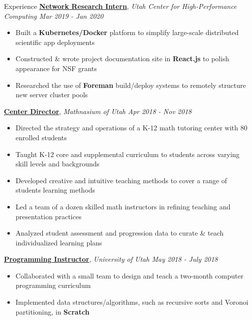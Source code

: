 \documentclass{resume/resume}
\begin{document}
\begin{rSection}{Experience}
    \href{https://slateci.io/}{\bf Network Research Intern}, {\em Utah Center for High-Performance Computing \hfill Mar 2019 - Jan 2020}
    \vspace{-6pt}
    \begin{itemize}[nosep]
        \item Built a {\bf Kubernetes/Docker} platform to simplify large-scale distributed scientific app deployments
        \item Constructed \& wrote project documentation site in {\bf React.js} to polish appearance for NSF grants
        \item Researched the use of {\bf Foreman} build/deploy systems to remotely structure new server cluster pools
    \end{itemize}
    
    \href{https://www.mathnasium.com/bountiful}{\bf Center Director}, {\em Mathnasium of Utah \hfill Apr 2018 - Nov 2018}
    \vspace{-6pt}
    \begin{itemize}[nosep]
        \item Directed the strategy and operations of a K-12 math tutoring center with 80 enrolled students
        \item Taught K-12 core and supplemental curriculum to students across varying skill levels and backgrounds
        \item Developed creative and intuitive teaching methods to cover a range of students learning methods
        \item Led a team of a dozen skilled math instructors in refining teaching and presentation practices
        \item Analyzed student assessment and progression data to curate \& teach individualized learning plans
    \end{itemize}
    
    \href{https://www.cs.utah.edu/~dejohnso/GREAT/}{\bf Programming Instructor}, {\em University of Utah \hfill May 2018 - July 2018}
    \vspace{-6pt}
    \begin{itemize}[nosep]
        \item Collaborated with a small team to design and teach a two-month computer programming curriculum
        \item Implemented data structures/algorithms, such as recursive sorts and Voronoi partitioning, in {\bf Scratch}
    \end{itemize}


\end{rSection}
\end{document}
